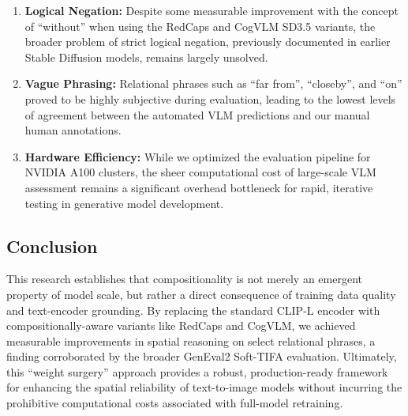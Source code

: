\begin{enumerate}
    \item \textbf{Logical Negation:} Despite some measurable improvement with the concept of ``without'' when using the RedCaps and CogVLM SD3.5 variants, the broader problem of strict logical negation, previously documented in earlier Stable Diffusion models, remains largely unsolved.
    \item \textbf{Vague Phrasing:} Relational phrases such as ``far from'', ``closeby'', and ``on'' proved to be highly subjective during evaluation, leading to the lowest levels of agreement between the automated VLM predictions and our manual human annotations.
    \item \textbf{Hardware Efficiency:} While we optimized the evaluation pipeline for NVIDIA A100 clusters, the sheer computational cost of large-scale VLM assessment remains a significant overhead bottleneck for rapid, iterative testing in generative model development.
\end{enumerate}

\subsection{Conclusion}
This research establishes that compositionality is not merely an emergent property of model scale, but rather a direct consequence of training data quality and text-encoder grounding. By replacing the standard CLIP-L encoder with compositionally-aware variants like RedCaps and CogVLM, we achieved measurable improvements in spatial reasoning on select relational phrases, a finding corroborated by the broader GenEval2 Soft-TIFA evaluation. Ultimately, this ``weight surgery'' approach provides a robust, production-ready framework for enhancing the spatial reliability of text-to-image models without incurring the prohibitive computational costs associated with full-model retraining.